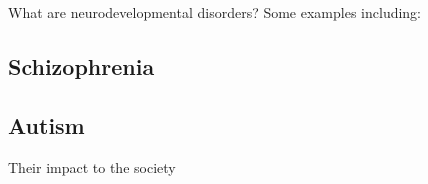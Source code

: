 What are neurodevelopmental disorders?
Some examples including:
\subsection{Schizophrenia}
\subsection{Autism}
Their impact to the society
